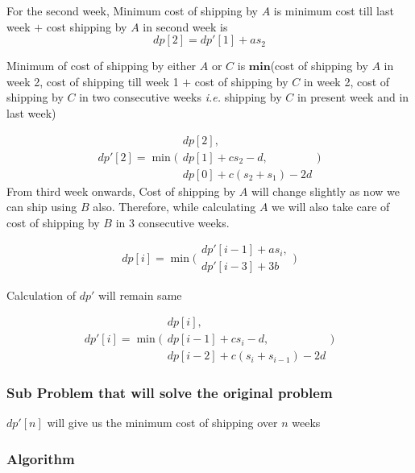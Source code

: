 \documentclass[12pt]{article}
\begin{document}
For the second week,
Minimum cost of shipping by $A$ is minimum cost till last week $+$ cost shipping by $A$ in second week is
$$dp[2] = dp'[1] + a s_2$$

Minimum of cost of shipping by either $A$ or $C$ is $\mathbf{min}$(cost of shipping by $A$ in week 2,  cost of shipping till week 1 $+$ cost of shipping by $C$ in week 2, cost of shipping by $C$ in two consecutive weeks \textit{i.e.} shipping by $C$ in present week and in last week)


$$dp'[2] = \min
\Biggl(
\begin{array}{cc}
    dp[2],                      \\
    dp[1] + c s_2 - d,          \\
    dp[0] + c (s_2 + s_1) - 2 d
\end{array}
\Biggr)
$$
From third week onwards,
Cost of shipping by $A$ will change slightly as now we can ship using $B$ also.
Therefore, while calculating $A$ we will also take care of cost of shipping by $B$ in 3 consecutive weeks.

$$dp[i] = \min
\Biggl(
\begin{array}{c}
    dp'[i-1] + a s_i, \\
    dp'[i-3] + 3b
\end{array}
\Biggr)
$$

Calculation of $dp'$ will remain same

$$dp'[i] = \min
\Biggl(
\begin{array}{c}
    dp[i],                           \\
    dp[i-1] + cs_i - d,              \\
    dp[i-2] + c(s_i + s_{i-1}) - 2 d
\end{array}
\Biggr)
$$

\subsubsection{Sub Problem that will solve the original problem}

$dp'[n]$ will give us the minimum cost of shipping over $n$ weeks

\subsubsection{Algorithm}
\end{document}
